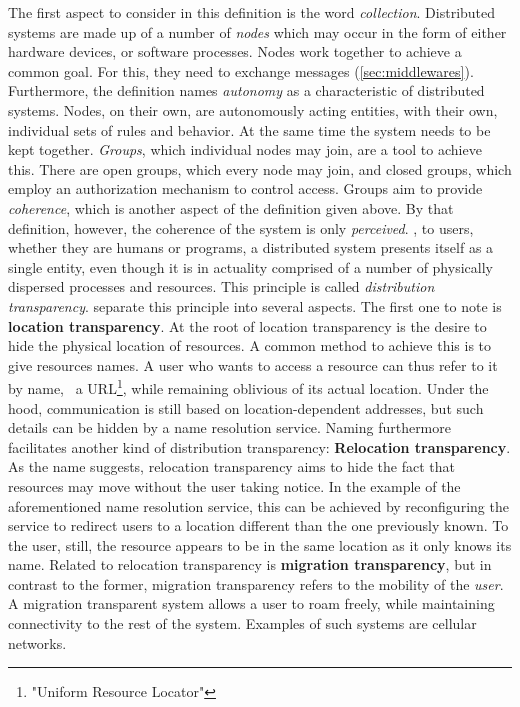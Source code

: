 The first aspect to consider in this definition is the word \emph{collection}. Distributed systems are made up of a number of \emph{nodes} which may occur in the form of either hardware devices, or software processes. Nodes work together to achieve a common goal. For this, they need to exchange messages (\cf \autoref{sec:middlewares}). Furthermore, the definition names \emph{autonomy} as a characteristic of distributed systems. Nodes, on their own, are autonomously acting entities, with their own, individual sets of rules and behavior. At the same time the system needs to be kept together. \emph{Groups}, which individual nodes may join, are a tool to achieve this. There are open groups, which every node may join, and closed groups, which employ an authorization mechanism to control access. 
Groups aim to provide \emph{coherence}, which is another aspect of the definition given above. By that definition, however, the coherence of the system is only \emph{perceived}. \Ie , to users, whether they are humans or programs, a distributed system presents itself as a single entity, even though it is in actuality comprised of a number of physically dispersed processes and resources. This principle is called \emph{distribution transparency}. \citeauthor*{tanenbaum2017distributed} \cite{tanenbaum2017distributed} separate this principle into several aspects. The first one to note is \textbf{location transparency}. At the root of location transparency is the desire to hide the physical location of resources. A common method to achieve this is to give resources names. A user who wants to access a resource can thus refer to it by name, \eg\ a URL\footnote{"Uniform Resource Locator"}, while remaining oblivious of its actual location. Under the hood, communication is still based on location-dependent addresses, but such details can be hidden by a name resolution service. Naming furthermore facilitates another kind of distribution transparency: \textbf{Relocation transparency}. As the name suggests, relocation transparency aims to hide the fact that resources may move without the user taking notice. In the example of the aforementioned name resolution service, this can be achieved by reconfiguring the service to redirect users to a location different than the one previously known. To the user, still, the resource appears to be in the same location as it only knows its name. Related to relocation transparency is \textbf{migration transparency}, but in contrast to the former, migration transparency refers to the mobility of the \emph{user}. A migration transparent system allows a user to roam freely, while maintaining connectivity to the rest of the system. Examples of such systems are cellular networks.

